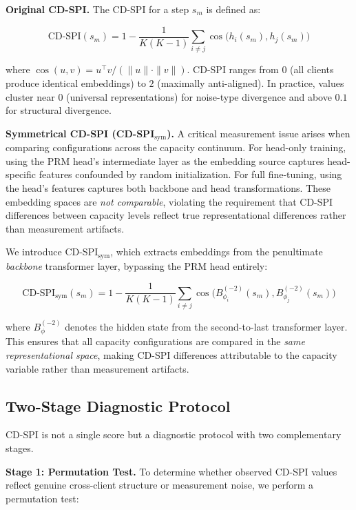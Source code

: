 \documentclass{article}
\begin{document}
\textbf{Original CD-SPI.}
The CD-SPI for a step $s_m$ is defined as:

\begin{equation}
\text{CD-SPI}(s_m) = 1 - \frac{1}{K(K-1)} \sum_{i \neq j} \cos\big(h_i(s_m), h_j(s_m)\big)
\label{eq:cdspi}
\end{equation}

where $\cos(u, v) = u^\top v / (\|u\| \cdot \|v\|)$.
CD-SPI ranges from $0$ (all clients produce identical embeddings) to $2$ (maximally anti-aligned).
In practice, values cluster near $0$ (universal representations) for noise-type divergence and above $0.1$ for structural divergence.

\textbf{Symmetrical CD-SPI (CD-SPI$_{\text{sym}}$).}
A critical measurement issue arises when comparing configurations across the capacity continuum.
For head-only training, using the PRM head's intermediate layer as the embedding source captures head-specific features confounded by random initialization.
For full fine-tuning, using the head's features captures both backbone and head transformations.
These embedding spaces are \emph{not comparable}, violating the requirement that CD-SPI differences between capacity levels reflect true representational differences rather than measurement artifacts.

We introduce CD-SPI$_{\text{sym}}$, which extracts embeddings from the penultimate \emph{backbone} transformer layer, bypassing the PRM head entirely:

\begin{equation}
\text{CD-SPI}_{\text{sym}}(s_m) = 1 - \frac{1}{K(K-1)} \sum_{i \neq j} \cos\big(B_{\phi_i}^{(-2)}(s_m), B_{\phi_j}^{(-2)}(s_m)\big)
\label{eq:cdspi_sym}
\end{equation}

where $B_{\phi}^{(-2)}$ denotes the hidden state from the second-to-last transformer layer.
This ensures that all capacity configurations are compared in the \emph{same representational space}, making CD-SPI differences attributable to the capacity variable rather than measurement artifacts.

\subsection{Two-Stage Diagnostic Protocol}

CD-SPI is not a single score but a diagnostic protocol with two complementary stages.

\textbf{Stage 1: Permutation Test.}
To determine whether observed CD-SPI values reflect genuine cross-client structure or measurement noise, we perform a permutation test:
\end{document}
